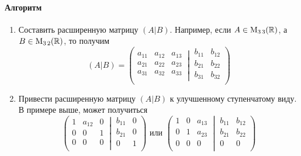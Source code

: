 \paragraph{Алгоритм}
\begin{enumerate}
\item Составить расширенную матрицу $(A|B)$. Например, если $A\in \operatorname{M}_{3\,3}(\mathbb R)$, а $B\in \operatorname{M}_{3\,2}(\mathbb R)$, то получим
\[
(A|B) = 
\left(
\left.
\begin{matrix}
{a_{11}}&{a_{12}}&{a_{13}}\\
{a_{21}}&{a_{22}}&{a_{23}}\\
{a_{31}}&{a_{32}}&{a_{33}}\\
\end{matrix}
\:\right|\:
\begin{matrix}
{b_{11}}&{b_{12}}\\
{b_{21}}&{b_{22}}\\
{b_{31}}&{b_{32}}\\
\end{matrix}
\right)
\]

\item Привести расширенную матрицу $(A|B)$ к улучшенному ступенчатому виду. В примере выше, может получиться
\[
\left(
\left.
\begin{matrix}
{1}&{a_{12}}&{0}\\
{0}&{0}&{1}\\
{0}&{0}&{0}\\
\end{matrix}
\:\right|\:
\begin{matrix}
{b_{11}}&{0}\\
{b_{21}}&{0}\\
{0}&{1}\\
\end{matrix}
\right)\text{ или }
\left(
\left.
\begin{matrix}
{1}&{0}&{a_{13}}\\
{0}&{1}&{a_{23}}\\
{0}&{0}&{0}\\
\end{matrix}
\:\right|\:
\begin{matrix}
{b_{11}}&{b_{12}}\\
{b_{21}}&{b_{22}}\\
{0}&{0}\\
\end{matrix}
\right)
\]



\end{enumerate}
